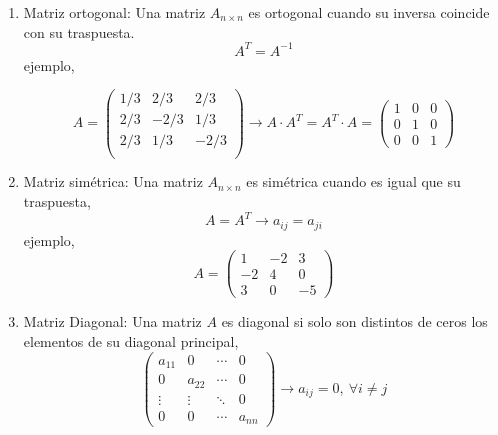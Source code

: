\begin{enumerate}
\item Matriz ortogonal: Una matriz $A_{n\times n}$ es ortogonal cuando su inversa coincide con su traspuesta.
\begin{equation*}
A^T=A^{-1}
\end{equation*}
ejemplo,

\begin{equation*}
A=\begin{pmatrix}
1/3& 2/3& 2/3\\
2/3& -2/3& 1/3\\
2/3& 1/3& -2/3\\
\end{pmatrix} \rightarrow A\cdot A^T =A^T\cdot A= \begin{pmatrix}
1& 0& 0\\
0& 1& 0\\
0& 0& 1
\end{pmatrix}
\end{equation*}
\item Matriz simétrica: Una matriz $A_{n\times n}$ es simétrica cuando es igual que su traspuesta,
\begin{equation*}
A=A^T \rightarrow a_{ij}=a_{ji}
\end{equation*}
ejemplo,
\begin{equation*}
A=\begin{pmatrix}
1& -2& 3\\
-2& 4& 0\\
3& 0& -5
\end{pmatrix}
\end{equation*} 
\item Matriz Diagonal: Una matriz $A$  es diagonal si solo son distintos de ceros los elementos de su diagonal principal,
\begin{equation*}
\begin{pmatrix}
a_{11}& 0& \cdots & 0\\
0& a_{22}& \cdots & 0\\
\vdots & \vdots & \ddots & 0\\
0& 0& \cdots & a_{nn}
\end{pmatrix} \rightarrow
a_{ij}=0,\ \forall i\neq j
\end{equation*}


\end{enumerate}
